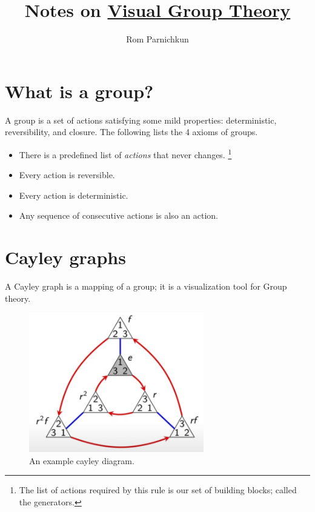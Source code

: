 \documentclass[twocolumn]{article}
\begin{document}
\title{Notes on \href{https://www.youtube.com/watch?v=UwTQdOop-nU&list=PLwV-9DG53NDxU337smpTwm6sef4x-SCLv}{Visual Group Theory}}
\author{Rom Parnichkun}

\maketitle

\section{What is a group?}

A group is a set of actions satisfying some mild properties: deterministic, reversibility, and closure. The following lists the 4 axioms of groups.
\begin{itemize}
    \item There is a predefined list of \textit{actions} that never changes. \footnote{The list of actions required by this rule is our set of building blocks; called the generators.}
    \item Every action is reversible.
    \item Every action is deterministic.
    \item Any sequence of consecutive actions is also an action.
\end{itemize}

\section{Cayley graphs}

A Cayley graph is a mapping of a group; it is a visualization tool for Group theory.

\begin{figure}[h]
    \centering
    \includegraphics[width = 3in]{figure/cayley.png}
    \caption{An example cayley diagram.}
    \label{fig:cayley}
\end{figure}
\end{document}
